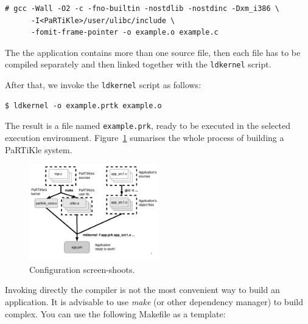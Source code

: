 \documentclass[a4paper,10pt,twoside]{report}
\begin{document}
\begin{verbatim}
# gcc -Wall -O2 -c -fno-builtin -nostdlib -nostdinc -Dxm_i386 \
      -I<PaRTiKle>/user/ulibc/include \
      -fomit-frame-pointer -o example.o example.c 
\end{verbatim}

The the application contains more than one source file, then each file
has to be compiled separately and then linked together with the
\texttt{ldkernel} script.

After that, we invoke the \texttt{ldkernel} script as follows:

\begin{verbatim}
$ ldkernel -o example.prtk example.o
\end{verbatim}

The result is a file named \texttt{example.prk}, ready to be executed
in the selected execution environment. Figure~\ref{img:building}
sumarises the whole process of building a PaRTiKle system.

\begin{figure}[tbhp]\centering
\includegraphics[width=0.5\textwidth]{img/partikle_building}
\caption{Configuration screen-shoots.}
\label{img:building}
\end{figure}


Invoking directly the compiler is not the most convenient way to build
an application. It is advisable to use \textit{make} (or other
dependency manager) to build complex. You can use the following
Makefile as a template:
\end{document}

